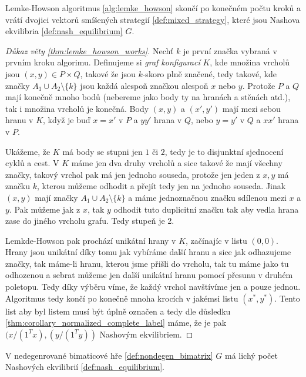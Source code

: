 \begin{theorem}
\label{thm:lemke_howson_works}
Lemke-Howson algoritmus \ref{alg:lemke_howson} skončí po konečném počtu kroků a vrátí dvojici vektorů smíšených strategií \ref{def:mixed_strategy}, které jsou Nashova ekvilibria \ref{def:nash_equilibrium} $G$. 
\end{theorem}
\begin{proof}[Důkaz věty \ref{thm:lemke_howson_works}]
Nechť $k$ je první značka vybraná v prvním kroku algorimu. 
Definujeme si \textit{graf konfigurací} $K$, kde množina vrcholů jsou $(x,y) \in P \times Q$, takové že jsou $k$-skoro plně značené, tedy takové, kde značky $A_1 \cup A_2 \setminus \{k\}$ jsou každá alespoň značkou alespoň $x$ nebo $y$. 
Protože $P$ a $Q$ mají konečně mnoho bodů (nebereme jako body ty na hranách a stěnách atd.), tak i množina vrcholů je konečná. 
Body $(x,y)$ a $(x',y')$ mají mezi sebou hranu v $K$, když je buď $x = x'$ v $P$ a $yy'$ hrana v $Q$, nebo $y = y'$ v $Q$ a $xx'$ hrana v $P$. 

Ukážeme, že $K$ má body se stupni jen $1$ či $2$, tedy je to disjunktní sjednocení cyklů a cest. 
V $K$ máme jen dva druhy vrcholů a sice takové že mají všechny značky, takový vrchol pak má jen jednoho souseda, protože jen jeden z $x,y$ má značku $k$, kterou můžeme odhodit a přejít tedy jen na jednoho souseda. 
Jinak $(x,y)$ mají značky $A_1 \cup A_2 \setminus \{k\}$ a máme jednoznačnou značku sdílenou mezi $x$ a $y$. 
Pak můžeme jak z $x$, tak $y$ odhodit tuto duplicitní značku tak aby vedla hrana zase do jiného vrcholu grafu. 
Tedy stupeň je 2. 

Lemkde-Howson pak prochází unikátní hrany v $K$, začínajíc v listu $(0,0)$. 
Hrany jsou unikátní díky tomu jak vybíráme další hranu a sice jak odhazujeme značky, tak máme-li hranu, kterou jsme přišli do vrcholu, tak tu máme jako tu odhozenou a sebrat můžeme jen další unikátní hranu pomocí přesunu v druhém poletopu. 
Tedy díky výběru víme, že každý vrchol navštívíme jen a pouze jednou. 
Algoritmus tedy končí po konečně mnoha krocích v jakémsi listu $(x^*,y^*)$. 
Tento list aby byl listem musí být úplně označen a tedy dle důsledku \ref{thm:corollary_normalized_complete_label} máme, že je pak $(x/(1^Tx), (y/(1^Ty))$ Nashovým ekvilibriem.
\end{proof}

\begin{theorem}
\label{thm:corollary_nash_odd}
V nedegenrované bimaticové hře \ref{def:nondegen_bimatrix} $G$ má lichý počet Nashových ekvilibrií \ref{def:nash_equilibrium}.
\end{theorem}

